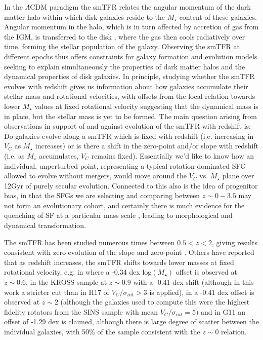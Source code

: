 \documentclass[fleqn,usenatbib]{mn2e}
\begin{document}
In the $\Lambda$CDM paradigm the smTFR relates the angular momentum of the dark matter halo within which disk galaxies reside to the $M_{\star}$ content of these galaxies.
Angular momentum in the halo, which is in turn affected by accretion of gas from the IGM, is transferred to the disk \citep{Fall1983}, where the gas then cools radiatively over time, forming the stellar population of the galaxy.
Observing the smTFR at different epochs thus offers constraints for galaxy formation and evolution models seeking to explain simultaneously the properties of dark matter halos and the dynamical properties of disk galaxies.
In principle, studying whether the smTFR evolves with redshift gives us information about how galaxies accumulate their stellar mass and rotational velocities, with offsets from the local relation towards lower $M_{\star}$ values at fixed rotational velocity suggesting that the dynamical mass is in place, but the stellar mass is yet to be formed.
The main question arising from observations in support of and against evolution of the smTFR with redshift is: Do galaxies evolve along a smTFR which is fixed with redshift (i.e. increasing in $V_{C}$ as $M_{\star}$ increases) or is there a shift in the zero-point and/or slope with redshift (i.e. as $M_{\star}$ accumulates, $V_{C}$ remains fixed).
Essentially we'd like to know how an individual, unperturbed point, representing a typical rotation-dominated SFG allowed to evolve without mergers, would move around the $V_{C}$ vs. $M_{\star}$ plane over 12Gyr of purely secular evolution.
Connected to this also is the idea of progenitor bias, in that the SFGs we are selecting and comparing between $z\sim0-3.5$ may not form an evolutionary cohort, and certainly there is much evidence for the quenching of SF at a particular mass scale \citep[e.g.][]{Keres2005,Dekel2006,Peng2010}, leading to morphological and dynamical transformation. 

The smTFR has been studied numerous times between $0.5 < z < 2$, giving results consistent with zero evolution of the slope and zero-point \citep[e.g.][]{Flores2006,Miller2011,Kassin2012,Miller2012,Vergani2012,Miller2014,Contini2015a,Molina2016,Pelliccia2016,DiTeodoro2016,Harrison2017}.
Others have reported that as redshift increases, the smTFR shifts towards lower masses at fixed rotational velocity, e.g. in \cite{Puech2008,Puech2010} where a -0.34 dex log$(M_{\star})$ offset is observed at $z\sim0.6$, in the \cite{Tiley2016a} KROSS sample at $z\sim0.9$ with a -0.41 dex shift (although in this work a stricter cut than in H17 of $V_{C}/\sigma_{int} > 3$ is applied), in \cite{Cresci2009} a -0.41 dex offset is observed at $z\sim2$ (although the galaxies used to compute this were the highest fidelity rotators from the SINS sample with mean $V_{C}/\sigma_{int} = 5)$ and in G11 an offset of -1.29 dex is claimed, although there is large degree of scatter between the individual galaxies, with 50\% of the sample consistent with the $z\sim0$ relation.
\end{document}
